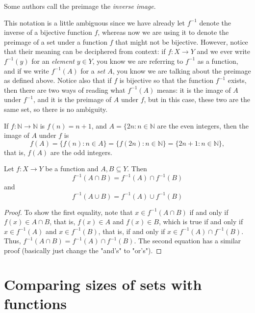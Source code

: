 \documentclass[11pt,dvipsnames]{book}
\numberwithin{equation}{section} %
\numberwithin{figure}{section} %
\numberwithin{table}{section} %
\begin{document}
Some authors call the preimage the \emph{inverse image}.


This notation is a little ambiguous since we have already let $f^{-1}$ denote the inverse of a bijective function $f$, whereas now we are using it to denote the preimage of a set under a function $f$ that might not be bijective. However, notice that their meaning can be deciphered from context: if $f\colon X\rightarrow Y$ and we ever write $f^{-1}(y)$ for an {\it element} $y\in Y$, you know we are referring to $f^{-1}$ as a function, and if we write $f^{-1}(A)$ for a {\it set $A$}, you know we are talking about the preimage as defined above. Notice also that if $f$ is bijective so that the function $f^{-1}$ exists, then there are two ways of reading what $f^{-1}(A)$ means: it is the image of $A$ under $f^{-1}$, and it is the preimage of $A$ under $f$, but in this case, these two are the same set, so there is no ambiguity.




\begin{example}
If  $f\colon\mathbb{N}\rightarrow \mathbb{N}$ is $f(n)=n+1$, and $A=\{2n:n\in\mathbb{N}$ are the even integers, then the image of $A$ under $f$ is 
\[
f(A)=\{f(n):n\in A\} = \{f(2n): n\in\mathbb{N}\} = \{2n+1:n\in\mathbb{N}\},\]
that is, $f(A)$ are the odd integers. 
\end{example}


\begin{theorem}
Let $f:X\rightarrow Y$ be a function and $A,B\subseteq Y$. Then
\[
f^{-1}(A\cap B)=f^{-1}(A)\cap f^{-1}(B)
\]
and 
\[
f^{-1}(A\cup B)=f^{-1}(A)\cup f^{-1}(B)
\]
\end{theorem}

\begin{proof}
To show the first equality, note that $x\in f^{-1}(A\cap B)$ if and only if $f(x)\in A\cap B$, that is, $f(x)\in A$ and $f(x)\in B$, which is true if and only if $x\in f^{-1}(A)$ and $x\in f^{-1}(B)$, that is, if and only if $x\in f^{-1}(A)\cap f^{-1}(B)$. Thus, $f^{-1}(A\cap B)=f^{-1}(A)\cap f^{-1}(B)$. The second equation has a similar proof (basically just change the "and's" to "or's").
\end{proof}



\section{Comparing sizes of sets with functions}

\end{document}

